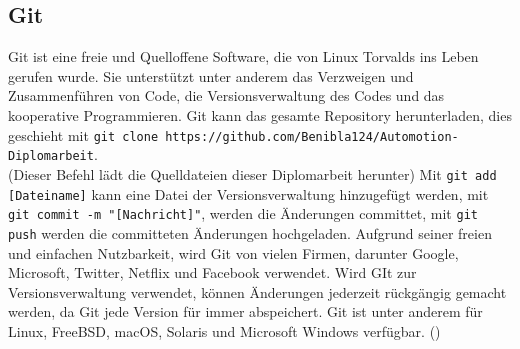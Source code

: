 \subsection{Git}
\label{subsec:tGit}
Git ist eine freie und Quelloffene Software, die von Linux Torvalds ins Leben gerufen wurde. Sie unterstützt unter anderem das Verzweigen und Zusammenführen von Code, die Versionsverwaltung des Codes und das kooperative Programmieren. Git kann das gesamte Repository herunterladen, dies geschieht mit \verb|git clone https://github.com/Benibla124/Automotion-Diplomarbeit|. \\ (Dieser Befehl lädt die Quelldateien dieser Diplomarbeit herunter) Mit \verb|git add [Dateiname]| kann eine Datei der Versionsverwaltung hinzugefügt werden, mit \verb|git commit -m "[Nachricht]"|, werden die Änderungen committet, mit \verb|git push| werden die committeten Änderungen hochgeladen. Aufgrund seiner freien und einfachen Nutzbarkeit, wird Git von vielen Firmen, darunter Google, Microsoft, Twitter, Netflix und Facebook verwendet. Wird GIt zur Versionsverwaltung verwendet, können Änderungen jederzeit rückgängig gemacht werden, da Git jede Version für immer abspeichert. Git ist unter anderem für Linux, FreeBSD, macOS, Solaris und Microsoft Windows verfügbar.
(\cite{GitDocs})